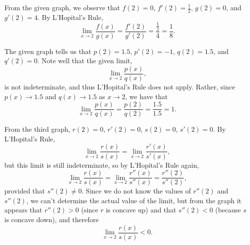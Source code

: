 \begin{activitySolution}
\ba
	\item From the given graph, we observe that $f(2) = 0$, $f'(2) = \frac{1}{2}$, $g(2)=0$, and $g'(2) = 4$.  By L'Hopital's Rule, 
	$$\lim_{x \to 2} \frac{f(x)}{g(x)} = \frac{f'(2)}{g'(2)} = \frac{\frac{1}{2}}{4} = \frac{1}{8}.$$
	\item The given graph tells us that $p(2) = 1.5$, $p'(2)=-1$, $q(2)=1.5$, and $q'(2)=0$.  Note well that the given limit,
	$$\lim_{x \to 2} \frac{p(x)}{q(x)},$$
	is not indeterminate, and thus L'Hopital's Rule does not apply.  Rather, since $p(x) \to 1.5$ and $q(x) \to 1.5$ as $x \to 2$, we have that 
	$$\lim_{x \to 2} \frac{p(x)}{q(x)} = \frac{p(2)}{q(2)} = \frac{1.5}{1.5} = 1.$$
	\item From the third graph,  $r(2)=0$, $r'(2)=0$, $s(2)=0$, $s'(2)=0$.  By L'Hopital's Rule,
	$$\lim_{x \to 2} \frac{r(x)}{s(x)} = \lim_{x \to 2} \frac{r'(x)}{s'(x)},$$
	but this limit is still indeterminate, so by L'Hopital's Rule again,
	$$\lim_{x \to 2} \frac{r(x)}{s(x)} = \lim_{x \to 2} \frac{r''(x)}{s''(x)} = \frac{r''(2)}{s''(2)},$$
provided that $s''(2) \ne 0$.  Since we do not know the values of $r''(2)$ and $s''(2)$, we can't determine the actual value of the limit, but from the graph it appears that $r''(2) > 0$ (since $r$ is concave up) and that $s''(2) < 0$ (because $s$ is concave down), and therefore
	$$\lim_{x \to 2} \frac{r(x)}{s(x)} < 0.$$
\ea
\end{activitySolution}
\aftera